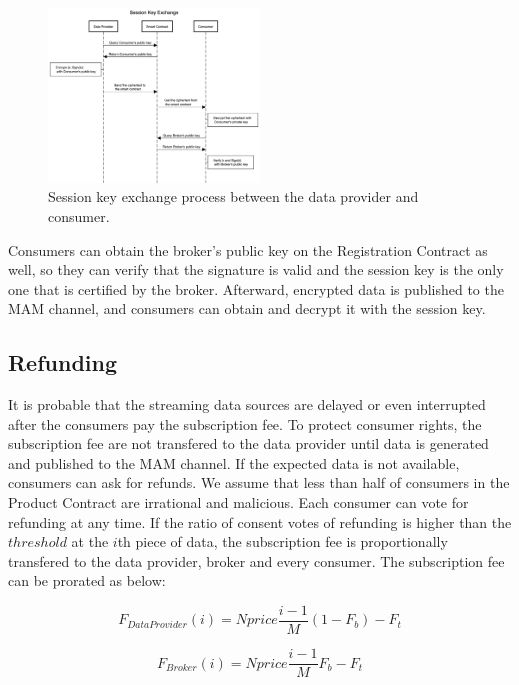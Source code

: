 \documentclass[journal,10pt,a4paper]{IEEEtran}
\begin{document}
\begin{figure}[h]
	\centering
	\includegraphics[width=0.5\textwidth]{key_exchange}
	\caption{Session key exchange process between the data provider and consumer.}
	\label{fig:key_exchange}
\end{figure}

Consumers can obtain the broker's public key on the Registration Contract as well, so they can verify that the signature is valid and the session key is the only one that is certified by the broker. Afterward, encrypted data is published to the MAM channel, and consumers can obtain and decrypt it with the session key.

\subsection{Refunding}
It is probable that the streaming data sources are delayed or even interrupted after the consumers pay the subscription fee. To protect consumer rights, the subscription fee are not transfered to the data provider until data is generated and published to the MAM channel. If the expected data is not available, consumers can ask for refunds. We assume that less than half of consumers in the Product Contract are irrational and malicious. Each consumer can vote for refunding at any time. If the ratio of consent votes of refunding is higher than the $threshold$ at the $i$th piece of data, the subscription fee is proportionally transfered to the data provider, broker and every consumer. The subscription fee can be prorated as below:

\begin{equation}
    F_{DataProvider}(i) = N price \frac{i-1}{M} (1-F_{b}) -F_{t}
\end{equation}

\begin{equation}
    F_{Broker}(i) = N price \frac{i-1}{M} F_{b} -F_{t}
\end{equation}
\end{document}
